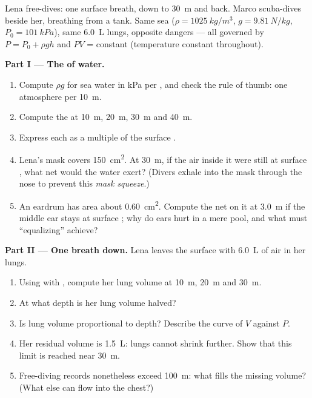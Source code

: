\begin{problem}
\label{pb:g10:pressure:1}
Lena free-dives: one surface breath, down to \qty{30}{m} and back.
Marco scuba-dives beside her, breathing from a tank. Same sea
($\rho = \qty{1025}{kg/m^3}$, $g = \qty{9.81}{N/kg}$,
$P_0 = \qty{101}{kPa}$), same \qty{6.0}{L} lungs, opposite dangers ---
all governed by $P = P_0 + \rho g h$ and $PV$ = constant (temperature
constant throughout).

\medskip
\noindent\textbf{Part I --- The  of water.}
\begin{enumerate}
  \item Compute $\rho g$ for sea water in \unit{kPa} per , and
        check the rule of thumb: one atmosphere per \qty{10}{m}.
  \item Compute the  at \qty{10}{m}, \qty{20}{m},
        \qty{30}{m} and \qty{40}{m}.
  \item Express each as a multiple of the surface .
  \item Lena's mask covers \qty{150}{cm^2}. At \qty{30}{m}, if the air
        inside it were still at surface , what net  would
        the water exert? (Divers exhale into the mask through the nose
        to prevent this \emph{mask squeeze}.)
  \item An eardrum has area about \qty{0.60}{cm^2}. Compute the net
         on it at \qty{3.0}{m} if the middle ear stays at surface
        ; why do ears hurt in a mere pool, and what must
        ``equalizing'' achieve?
\end{enumerate}

\medskip
\noindent\textbf{Part II --- One breath down.}
Lena leaves the surface with \qty{6.0}{L} of air in her lungs.
\begin{enumerate}[resume]
  \item Using  with , compute her lung
        volume at \qty{10}{m}, \qty{20}{m} and \qty{30}{m}.
  \item At what depth is her lung volume halved?
  \item Is lung volume proportional to depth? Describe the curve of
        $V$ against  $P$.
  \item Her residual volume is \qty{1.5}{L}: lungs cannot shrink
        further. Show that this limit is reached near \qty{30}{m}.
  \item Free-diving records nonetheless exceed \qty{100}{m}: what
        fills the missing volume? (What else can flow into the chest?)
\end{enumerate}


\end{problem}
